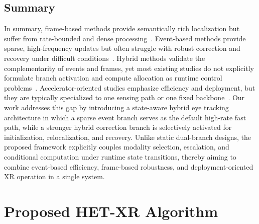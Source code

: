 \documentclass[journal]{IEEEtran}
\begin{document}
\subsection{Summary}
In summary, frame-based methods provide semantically rich localization but suffer from rate-bounded and dense processing~\cite{li2018etracker,feng2022real,chen2022real,jain2025flattrack}. Event-based methods provide sparse, high-frequency updates but often struggle with robust correction and recovery under difficult conditions~\cite{chen20233et,li2023track,li2024gaze,sen2024eyetraes,zhang2024swift,ding2025facet}. Hybrid methods validate the complementarity of events and frames, yet most existing studies do not explicitly formulate branch activation and compute allocation as runtime control problems~\cite{zhao2023ev,chen2025ex}. Accelerator-oriented studies emphasize efficiency and deployment, but they are typically specialized to one sensing path or one fixed backbone~\cite{you2022eyecod,bonazzi2024retina,han2026janeeye,giordano2025sub}.
%
Our work addresses this gap by introducing a state-aware hybrid eye tracking architecture in which a sparse event branch serves as the default high-rate fast path, while a stronger hybrid correction branch is selectively activated for initialization, relocalization, and recovery. Unlike static dual-branch designs, the proposed framework explicitly couples modality selection, escalation, and conditional computation under runtime state transitions, thereby aiming to combine event-based efficiency, frame-based robustness, and deployment-oriented XR operation in a single system.
%
\section{Proposed HET-XR Algorithm}
\label{sec:algorithm}
\end{document}
